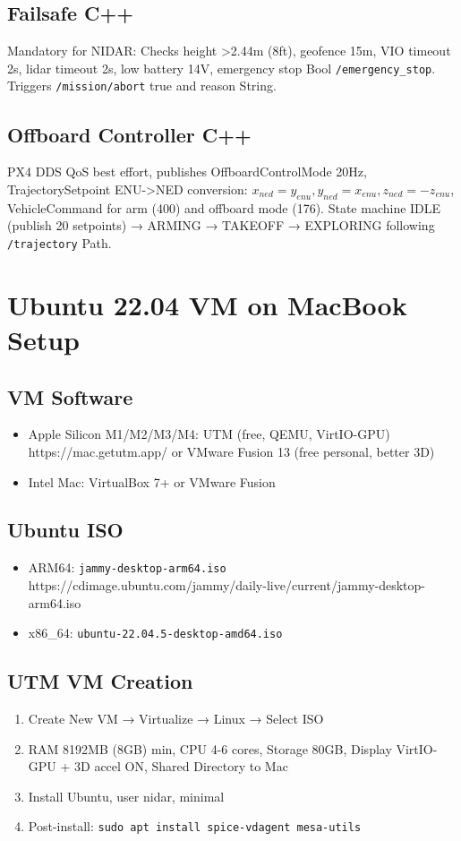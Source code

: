 \documentclass[12pt,a4paper]{article}
\begin{document}
\subsection{Failsafe C++}

Mandatory for NIDAR: Checks height >2.44m (8ft), geofence 15m, VIO timeout 2s, lidar timeout 2s, low battery 14V, emergency stop Bool \texttt{/emergency\_stop}. Triggers \texttt{/mission/abort} true and reason String.

\subsection{Offboard Controller C++}

PX4 DDS QoS best effort, publishes OffboardControlMode 20Hz, TrajectorySetpoint ENU->NED conversion: $x_{ned}=y_{enu}, y_{ned}=x_{enu}, z_{ned}=-z_{enu}$, VehicleCommand for arm (400) and offboard mode (176). State machine IDLE (publish 20 setpoints) → ARMING → TAKEOFF → EXPLORING following \texttt{/trajectory} Path.

\section{Ubuntu 22.04 VM on MacBook Setup}

\subsection{VM Software}
\begin{itemize}
    \item Apple Silicon M1/M2/M3/M4: UTM (free, QEMU, VirtIO-GPU) https://mac.getutm.app/ or VMware Fusion 13 (free personal, better 3D)
    \item Intel Mac: VirtualBox 7+ or VMware Fusion
\end{itemize}

\subsection{Ubuntu ISO}
\begin{itemize}
    \item ARM64: \texttt{jammy-desktop-arm64.iso} https://cdimage.ubuntu.com/jammy/daily-live/current/jammy-desktop-arm64.iso
    \item x86\_64: \texttt{ubuntu-22.04.5-desktop-amd64.iso}
\end{itemize}

\subsection{UTM VM Creation}
\begin{enumerate}
    \item Create New VM → Virtualize → Linux → Select ISO
    \item RAM 8192MB (8GB) min, CPU 4-6 cores, Storage 80GB, Display VirtIO-GPU + 3D accel ON, Shared Directory to Mac
    \item Install Ubuntu, user nidar, minimal
    \item Post-install: \texttt{sudo apt install spice-vdagent mesa-utils}
\end{enumerate}
\end{document}
